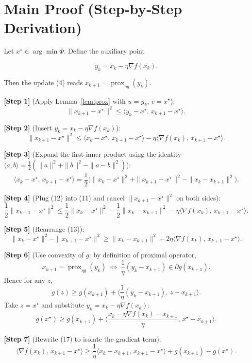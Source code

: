 \documentclass{article}
\newcommand{\prox}{\operatorname{prox}}
\begin{document}
\section*{Main Proof (Step‑by‑Step Derivation)}
Let $x^{\star}\in\arg\min\Phi$. Define the auxiliary point  

\[
y_{k}=x_{k}-\eta\nabla f(x_{k}) .
\tag{9}
\]

Then the update (4) reads $x_{k+1}= \prox_{\eta g}(y_{k})$.

\bigskip

\noindent\textbf{[Step 1]} (Apply Lemma~\ref{lem:prox} with $u=y_{k}$, $v=x^{\star}$):
\[
\|x_{k+1}-x^{\star}\|^{2}
\le \langle y_{k}-x^{\star},\,x_{k+1}-x^{\star}\rangle .
\tag{10}
\]

\noindent\textbf{[Step 2]} (Insert $y_{k}=x_{k}-\eta\nabla f(x_{k})$):
\[
\|x_{k+1}-x^{\star}\|^{2}
\le \langle x_{k}-x^{\star},\,x_{k+1}-x^{\star}\rangle
-\eta\langle\nabla f(x_{k}),\,x_{k+1}-x^{\star}\rangle .
\tag{11}
\]

\noindent\textbf{[Step 3]} (Expand the first inner product using the identity 
$\langle a,b\rangle=\frac12(\|a\|^{2}+\|b\|^{2}-\|a-b\|^{2})$):
\[
\langle x_{k}-x^{\star},\,x_{k+1}-x^{\star}\rangle
=\frac12\bigl(\|x_{k}-x^{\star}\|^{2}+\|x_{k+1}-x^{\star}\|^{2}
-\|x_{k}-x_{k+1}\|^{2}\bigr).
\tag{12}
\]

\noindent\textbf{[Step 4]} (Plug (12) into (11) and cancel $\|x_{k+1}-x^{\star}\|^{2}$ on both sides):
\[
\frac12\|x_{k+1}-x^{\star}\|^{2}
\le \frac12\|x_{k}-x^{\star}\|^{2}
-\frac12\|x_{k}-x_{k+1}\|^{2}
-\eta\langle\nabla f(x_{k}),\,x_{k+1}-x^{\star}\rangle .
\tag{13}
\]

\noindent\textbf{[Step 5]} (Rearrange (13)):
\[
\|x_{k}-x^{\star}\|^{2}
-\|x_{k+1}-x^{\star}\|^{2}
\ge \|x_{k}-x_{k+1}\|^{2}
+2\eta\langle\nabla f(x_{k}),\,x_{k+1}-x^{\star}\rangle .
\tag{14}
\]

\noindent\textbf{[Step 6]} (Use convexity of $g$: by definition of proximal operator,
\[
x_{k+1}= \prox_{\eta g}(y_{k})
\;\Longleftrightarrow\;
\frac{1}{\eta}(y_{k}-x_{k+1})\in\partial g(x_{k+1}).
\tag{15}
\]
Hence for any $z$,
\[
g(z)\ge g(x_{k+1})+\Big\langle\frac{1}{\eta}(y_{k}-x_{k+1}),\,z-x_{k+1}\Big\rangle .
\tag{16}
\]
Take $z=x^{\star}$ and substitute $y_{k}=x_{k}-\eta\nabla f(x_{k})$:
\[
g(x^{\star})\ge g(x_{k+1})+\Big\langle \frac{x_{k}-\eta\nabla f(x_{k})-x_{k+1}}{\eta},\,x^{\star}-x_{k+1}\Big\rangle .
\tag{17}
\]
\]

\noindent\textbf{[Step 7]} (Rewrite (17) to isolate the gradient term):
\[
\langle\nabla f(x_{k}),\,x_{k+1}-x^{\star}\rangle
\ge \frac{1}{\eta}\langle x_{k}-x_{k+1},\,x_{k+1}-x^{\star}\rangle
+g(x_{k+1})-g(x^{\star}).
\tag{18}
\]
\end{document}
